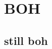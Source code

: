 \documentclass[../main.tex]{subfiles}
\begin{document}
\section{BOH}
\subsection{still boh}
\end{document}
